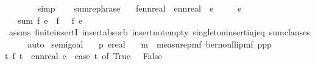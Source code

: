 \begin{isabellebody}
\ \ \ \ \ \ \isamarkupfalse%
\ simp\isanewline
\ \ \isamarkupfalse%
\isanewline
{}\isamarkupfalse%
%
\endisatagproof
{\isafoldproof}%
%
\isadelimproof
\isanewline
%
\endisadelimproof
\isanewline
\isanewline
{}\isamarkupfalse%
\ sum{\isacharunderscore}{\kern0pt}rephrase{\isacharcolon}{\kern0pt}\isanewline
\ \ \ f{\isacharcolon}{\kern0pt}{\isacharcolon}{\kern0pt}{\isachardoublequoteopen}ennreal\ {\isasymRightarrow}\ ennreal{\isachardoublequoteclose}\ \ e\isanewline
\ \ \ {\isachardoublequoteopen}{}\ {\isasymnoteq}\ e{\isachardoublequoteclose}\isanewline
\ \ \ {\isachardoublequoteopen}sum\ f\ {\isacharbraceleft}{\kern0pt}{}{\isacharcomma}{\kern0pt}e{\isacharbraceright}{\kern0pt}\ {\isacharequal}{\kern0pt}\ f\ {}\ {\isacharplus}{\kern0pt}\ f\ {\isacharparenleft}{\kern0pt}e{\isacharparenright}{\kern0pt}{\isachardoublequoteclose}\isanewline
%
\isadelimproof
\ \ %
\endisadelimproof
%
\isatagproof
{}\isamarkupfalse%
\ assms\ finite{\isachardot}{\kern0pt}insertI\ insert{\isacharunderscore}{\kern0pt}absorb\ insert{\isacharunderscore}{\kern0pt}not{\isacharunderscore}{\kern0pt}empty\ singleton{\isacharunderscore}{\kern0pt}insert{\isacharunderscore}{\kern0pt}inj{\isacharunderscore}{\kern0pt}eq{\isacharprime}{\kern0pt}\ sum{\isacharunderscore}{\kern0pt}clauses{\isacharparenleft}{\kern0pt}{}{\isacharparenright}{\kern0pt}\ \isanewline
\ \ \isamarkupfalse%
\ auto%
\endisatagproof
{\isafoldproof}%
%
\isadelimproof
\isanewline
%
\endisadelimproof
\isanewline
\isanewline
{}\isamarkupfalse%
\ semi{\isacharunderscore}{\kern0pt}goal{}{}{\isacharcolon}{\kern0pt}\isanewline
\ \ \ p{}\ e{\isacharcolon}{\kern0pt}{\isacharcolon}{\kern0pt}real\isanewline
\ \ \ {\isachardoublequoteopen}m\ {\isacharequal}{\kern0pt}\ measure{\isacharunderscore}{\kern0pt}pmf\ {\isacharparenleft}{\kern0pt}bernoulli{\isacharunderscore}{\kern0pt}pmf\ p{}{\isacharparenright}{\kern0pt}{\isachardoublequoteclose}{\isachardoublequoteopen}{}{\isasymle}p{}{\isachardoublequoteclose}{\isachardoublequoteopen}p{}{\isasymle}{}{\isachardoublequoteclose}\isanewline
{\isachardoublequoteopen}{\isasymAnd}t{\isachardot}{\kern0pt}\ f\ t\ {\isacharequal}{\kern0pt}\ ennreal\ e\ {\isacharasterisk}{\kern0pt}\ {\isacharparenleft}{\kern0pt}case\ t\ of\ True\ {\isasymRightarrow}\ {}{\isacharbar}{\kern0pt}\ False\ {\isasymRightarrow}\ {}{\isacharparenright}{\kern0pt}{\isachardoublequoteclose}\isanewline

\end{isabellebody}
